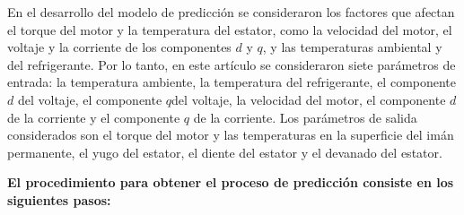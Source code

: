 \documentclass{article}
\begin{document}
En el desarrollo del modelo de predicción se consideraron los factores que afectan el torque del motor y la temperatura del estator, como la velocidad del motor, el voltaje y la corriente de los componentes $d$ y $q$, y las temperaturas ambiental y del refrigerante. Por lo tanto, en este artículo se consideraron siete parámetros de entrada: la temperatura ambiente, la temperatura del refrigerante, el componente $d$ del voltaje, el componente $q$$ $del voltaje, la velocidad del motor, el componente $d$ de la corriente y el componente $q$ de la corriente. Los parámetros de salida considerados son el torque del motor y las temperaturas en la superficie del imán permanente, el yugo del estator, el diente del estator y el devanado del estator.

\textbf{El procedimiento para obtener el proceso de predicción consiste en los siguientes pasos:}
\end{document}
